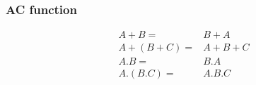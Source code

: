 \subsubsection*{AC function}
\begin{align*}
    A + B = & B + A \\
    A + (B + C) = & A + B + C \\
    A.B = & B.A \\
    A.(B.C) = & A.B.C \\
\end{align*}



  





      

